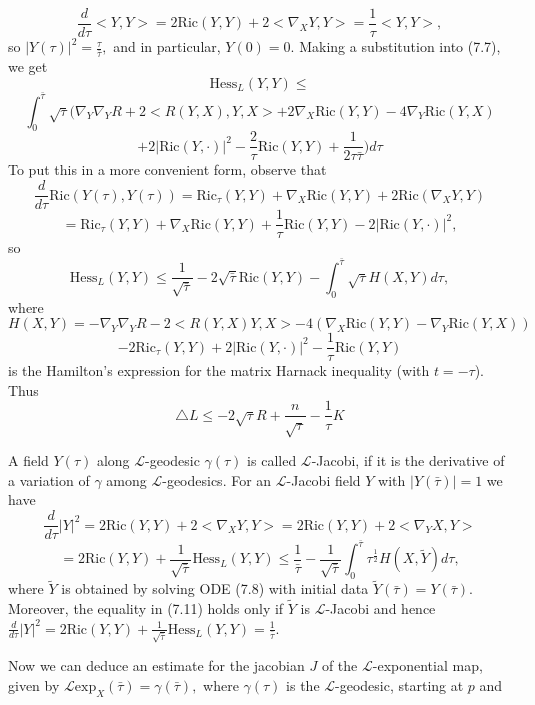 \documentclass[12pt]{article}
\theoremstyle{plain}
{\swapnumbers
\newtheorem{thm}{Theorem}[section]
\newtheorem{cor}[thm]{Corollary}
\newtheorem{lem}[thm]{Lemma}
\newtheorem{prop}[thm]{Proposition}
}
\theoremstyle{definition}
{\swapnumbers
\newtheorem{defn}[thm]{Definition}
\newtheorem{nota}[thm]{Notation}
\newtheorem{parag}[thm]{}
\newtheorem*{parstr}{\addtocounter{thm}{1}\thesection.\arabic{thm}*}
\newtheorem*{intropar}{\addtocounter{thm}{1}\arabic{thm}}
}
\theoremstyle{remark} {\swapnumbers
\newtheorem{rem}[thm]{Remark}
\newtheorem{exam}[thm]{Example}
\newtheorem{lemma}[thm]{Lemma}
\newtheorem{claim}[thm]{Claim}
}
\numberwithin{equation}{section}
\begin{document}
$$ \frac{d}{d\tau}<Y,Y>=2\mbox{Ric}(Y,Y)+2<\nabla_X
Y,Y>=\frac{1}{\tau}<Y,Y>,$$ so
$|Y(\tau)|^2=\frac{\tau}{\bar{\tau}},$ and in particular,
$Y(0)=0.$ Making a substitution into (7.7), we get
$$\mbox{Hess}_L(Y,Y)\le$$
$$\int_0^{\bar{\tau}}\sqrt{\tau}(\nabla_Y \nabla_Y
R+2<R(Y,X),Y,X>+2\nabla_X\mbox{Ric}(Y,Y)-4\nabla_Y\mbox{Ric}(Y,X)$$
$$
 +2|\mbox{Ric}(Y,\cdot)|^2-
\frac{2}{\tau}\mbox{Ric}(Y,Y)+\frac{1}{2\tau\bar{\tau}})d\tau$$ To
put this in a more convenient form, observe that
$$\frac{d}{d\tau}\mbox{Ric}(Y(\tau),Y(\tau))=\mbox{Ric}_{\tau}(Y,Y)+\nabla_X\mbox{Ric}(Y,Y)+
2\mbox{Ric}(\nabla_X Y,Y)$$
$$=\mbox{Ric}_{\tau}(Y,Y)+\nabla_X\mbox{Ric}(Y,Y)+\frac{1}{\tau}\mbox{Ric}(Y,Y)-
2|\mbox{Ric}(Y,\cdot)|^2,$$ so \begin{equation}
\mbox{Hess}_L(Y,Y)\le\frac{1}{\sqrt{\bar{\tau}}}-2\sqrt{\bar{\tau}}\mbox{Ric}(Y,Y)-\int_0^{\bar{\tau}}
{\sqrt{\tau}H(X,Y)d\tau},\end{equation} where $$H(X,Y)=-\nabla_Y
\nabla_Y
R-2<R(Y,X)Y,X>-4(\nabla_X\mbox{Ric}(Y,Y)-\nabla_Y\mbox{Ric}(Y,X))$$
$$-2\mbox{Ric}_{\tau}(Y,Y)+
2|\mbox{Ric}(Y,\cdot)|^2-\frac{1}{\tau}\mbox{Ric}(Y,Y)$$ is the
Hamilton's expression for the matrix Harnack inequality (with
$t=-\tau$). Thus \begin{equation} \triangle
L\le-2\sqrt{\tau}R+\frac{n}{\sqrt{\tau}}-\frac{1}{\tau}K\end{equation}
\par A field $Y(\tau)$ along $\mathcal{L}$-geodesic $\gamma(\tau)$
is called $\mathcal{L}$-Jacobi, if it is the derivative of a
variation of $\gamma$ among $\mathcal{L}$-geodesics. For an
$\mathcal{L}$-Jacobi field $Y$ with $|Y(\bar{\tau})|=1$ we have
$$ \frac{d}{d\tau}|Y|^2=2\mbox{Ric}(Y,Y)+2<\nabla_X
Y,Y>=2\mbox{Ric}(Y,Y)+2<\nabla_Y X,Y>$$
\begin{equation}=2\mbox{Ric}(Y,Y)+\frac{1}{\sqrt{\bar{\tau}}}\mbox{Hess}_L(Y,Y)\le\frac{1}{\bar{\tau}}-
\frac{1}{\sqrt{\bar{\tau}}}\int_0^{\bar{\tau}}{\tau^{\frac{1}{2}}H(X,\tilde{Y})d\tau},\end{equation}
where $\tilde{Y}$ is obtained by solving ODE (7.8) with initial
data $\tilde{Y}(\bar{\tau})=Y(\bar{\tau}).$ Moreover, the equality
in (7.11) holds only if $\tilde{Y}$ is $\mathcal{L}$-Jacobi and
hence
$\frac{d}{d\tau}|Y|^2=2\mbox{Ric}(Y,Y)+\frac{1}{\sqrt{\bar{\tau}}}\mbox{Hess}_L(Y,Y)
=\frac{1}{\bar{\tau}}.$ \par Now we can deduce an estimate for the
jacobian $J$ of the $\mathcal{L}$-exponential map, given by
$\mathcal{L}\mbox{exp}_X(\bar{\tau})=\gamma(\bar{\tau}),$ where
$\gamma(\tau)$ is the $\mathcal{L}$-geodesic, starting at $p$ and
\end{document}
